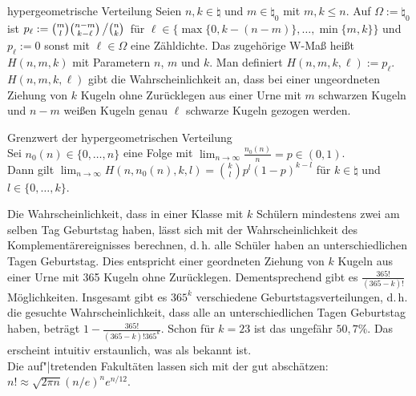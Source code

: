 \linie

\begin{Def}{hypergeometrische Verteilung}
    Seien $n, k \in \natural$ und $m \in \natural_0$ mit $m, k \le n$.
    Auf $\Omega := \natural_0$ ist
    $p_\ell := \binom{m}{l}\binom{n - m}{k - \ell} \left/\binom{n}{k}\right.$ für
    $\ell \in \{\max\{0, k - (n - m)\}, \dotsc, \min\{m, k\}\}$ und
    $p_\ell := 0$ sonst mit $\ell \in \Omega$ eine Zähldichte.
    Das zugehörige W-Maß heißt  $H(n, m, k)$
    mit Parametern $n$, $m$ und $k$.
    Man definiert $H(n, m, k, \ell) := p_\ell$.\\
    $H(n, m, k, \ell)$ gibt die Wahrscheinlichkeit an, dass bei einer ungeordneten Ziehung
    von $k$ Kugeln ohne Zurücklegen aus einer Urne mit $m$ schwarzen Kugeln und $n - m$
    weißen Kugeln genau $\ell$ schwarze Kugeln gezogen werden.
\end{Def}

\begin{Satz}{Grenzwert der hypergeometrischen Verteilung}\\
    Sei $n_0(n) \in \{0, \dotsc, n\}$ eine Folge mit
    $\lim_{n \to \infty} \frac{n_0(n)}{n} = p \in (0, 1)$.\\
    Dann gilt $\lim_{n \to \infty} H(n, n_0(n), k, l) = \binom{k}{l} p^l (1 - p)^{k-l}$
    für $k \in \natural$ und $l \in \{0, \dotsc, k\}$.
\end{Satz}

\linie

\begin{Bsp}
    Die Wahrscheinlichkeit, dass in einer Klasse mit $k$ Schülern mindestens zwei am selben Tag
    Geburtstag haben, lässt sich mit der Wahrscheinlichkeit des Komplementärereignisses berechnen,
    d.\,h. alle Schüler haben an unterschiedlichen Tagen Geburtstag.
    Dies entspricht einer geordneten Ziehung von $k$ Kugeln aus einer Urne mit 365 Kugeln
    ohne Zurücklegen.
    Dementsprechend gibt es $\frac{365!}{(365 - k)!}$ Möglichkeiten.
    Insgesamt gibt es $365^k$ verschiedene Geburtstagsverteilungen, d.\,h. die gesuchte
    Wahrscheinlichkeit, dass alle an unterschiedlichen Tagen Geburtstag haben, beträgt
    $1 - \frac{365!}{(365 - k)! 365^k}$.
    Schon für $k = 23$ ist das ungefähr $50{,}7\%$.
    Das erscheint intuitiv erstaunlich, was als  bekannt ist.\\
    Die auf"|tretenden Fakultäten lassen sich mit der  gut
    abschätzen:\\
    $n! \approx \sqrt{2\pi n} (n/e)^n e^{n/12}$.
\end{Bsp}


